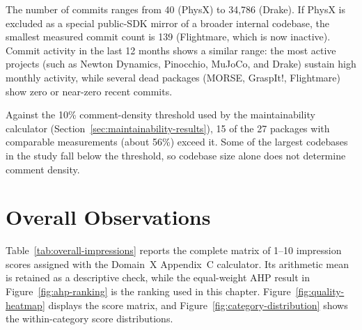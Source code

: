 The number of commits ranges from 40 (PhysX) to 34,786 (Drake). If PhysX is excluded as a special public-SDK mirror of a broader internal codebase, the smallest measured commit count is 139 (Flightmare, which is now inactive). Commit activity in the last 12 months shows a similar range: the most active projects (such as Newton Dynamics, Pinocchio, MuJoCo, and Drake) sustain high monthly activity, while several dead packages (MORSE, GraspIt!, Flightmare) show zero or near-zero recent commits.

Against the 10\% comment-density threshold used by the maintainability calculator (Section~\ref{sec:maintainability-results}), 15 of the 27 packages with comparable measurements (about 56\%) exceed it. Some of the largest codebases in the study fall below the threshold, so codebase size alone does not determine comment density.

\section{Overall Observations}
\label{sec:overall-observations}

Table~\ref{tab:overall-impressions} reports the complete matrix of 1--10 impression scores assigned with the Domain~X Appendix~C calculator. Its arithmetic mean is retained as a descriptive check, while the equal-weight AHP result in Figure~\ref{fig:ahp-ranking} is the ranking used in this chapter. Figure~\ref{fig:quality-heatmap} displays the score matrix, and Figure~\ref{fig:category-distribution} shows the within-category score distributions.

